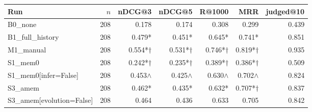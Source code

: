 \begin{tabular}{l r r r r r r}
\toprule
Run & $n$ & nDCG@3 & nDCG@5 & R@1000 & MRR & judged@10 \\
\midrule
B0\_none & 208 & 0.178 & 0.174 & 0.308 & 0.299 & 0.439 \\
B1\_full\_history & 208 & 0.479* & 0.451* & 0.645* & 0.741* & 0.851 \\
M1\_manual & 208 & 0.554*$\dagger$ & 0.531*$\dagger$ & 0.746*$\dagger$ & 0.819*$\dagger$ & 0.935 \\
S1\_mem0 & 208 & 0.242*$\dagger$ & 0.235*$\dagger$ & 0.389*$\dagger$ & 0.386*$\dagger$ & 0.509 \\
S1\_mem0[infer=False] & 208 & 0.453$\wedge$ & 0.425$\wedge$ & 0.630$\wedge$ & 0.702$\wedge$ & 0.824 \\
S3\_amem & 208 & 0.462* & 0.435* & 0.632* & 0.707*$\dagger$ & 0.837 \\
S3\_amem[evolution=False] & 208 & 0.464 & 0.436 & 0.633 & 0.705 & 0.842 \\
\bottomrule
\end{tabular}
